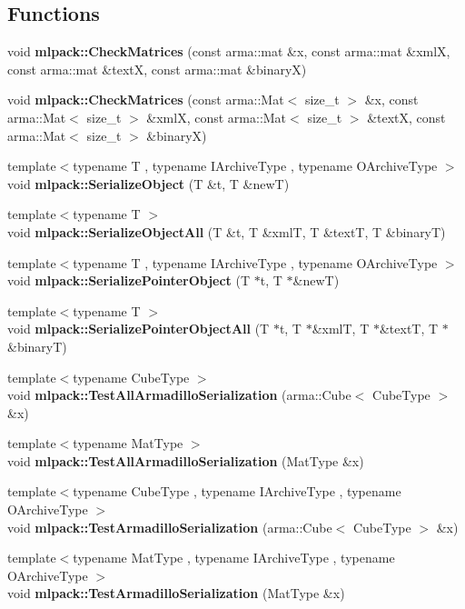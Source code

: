 \subsection*{Functions}
\begin{DoxyCompactItemize}
\item 
void {\bf mlpack\+::\+Check\+Matrices} (const arma\+::mat \&x, const arma\+::mat \&xmlX, const arma\+::mat \&textX, const arma\+::mat \&binaryX)
\item 
void {\bf mlpack\+::\+Check\+Matrices} (const arma\+::\+Mat$<$ size\+\_\+t $>$ \&x, const arma\+::\+Mat$<$ size\+\_\+t $>$ \&xmlX, const arma\+::\+Mat$<$ size\+\_\+t $>$ \&textX, const arma\+::\+Mat$<$ size\+\_\+t $>$ \&binaryX)
\item 
{\footnotesize template$<$typename T , typename I\+Archive\+Type , typename O\+Archive\+Type $>$ }\\void {\bf mlpack\+::\+Serialize\+Object} (T \&t, T \&newT)
\item 
{\footnotesize template$<$typename T $>$ }\\void {\bf mlpack\+::\+Serialize\+Object\+All} (T \&t, T \&xmlT, T \&textT, T \&binaryT)
\item 
{\footnotesize template$<$typename T , typename I\+Archive\+Type , typename O\+Archive\+Type $>$ }\\void {\bf mlpack\+::\+Serialize\+Pointer\+Object} (T $\ast$t, T $\ast$\&newT)
\item 
{\footnotesize template$<$typename T $>$ }\\void {\bf mlpack\+::\+Serialize\+Pointer\+Object\+All} (T $\ast$t, T $\ast$\&xmlT, T $\ast$\&textT, T $\ast$\&binaryT)
\item 
{\footnotesize template$<$typename Cube\+Type $>$ }\\void {\bf mlpack\+::\+Test\+All\+Armadillo\+Serialization} (arma\+::\+Cube$<$ Cube\+Type $>$ \&x)
\item 
{\footnotesize template$<$typename Mat\+Type $>$ }\\void {\bf mlpack\+::\+Test\+All\+Armadillo\+Serialization} (Mat\+Type \&x)
\item 
{\footnotesize template$<$typename Cube\+Type , typename I\+Archive\+Type , typename O\+Archive\+Type $>$ }\\void {\bf mlpack\+::\+Test\+Armadillo\+Serialization} (arma\+::\+Cube$<$ Cube\+Type $>$ \&x)
\item 
{\footnotesize template$<$typename Mat\+Type , typename I\+Archive\+Type , typename O\+Archive\+Type $>$ }\\void {\bf mlpack\+::\+Test\+Armadillo\+Serialization} (Mat\+Type \&x)
\end{DoxyCompactItemize}


